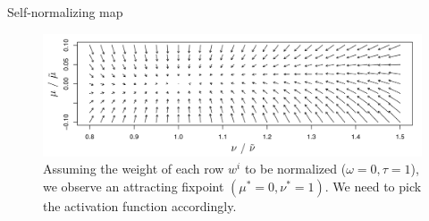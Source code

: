 \documentclass[aspectratio=169]{beamer}
\begin{document}

\begin{frame}{Self-normalizing map}


\begin{figure}[h!]
	\includegraphics[width=\linewidth]{images/snn_map.png}
	\caption{Assuming the weight of each row $w^i$ to be normalized ($\omega = 0, \tau = 1$), we observe an attracting 		fixpoint $( \mu^* = 0, \nu^* =1) $. We need to pick the activation function accordingly.}
	\end{figure}

\end{frame}
\end{document}
